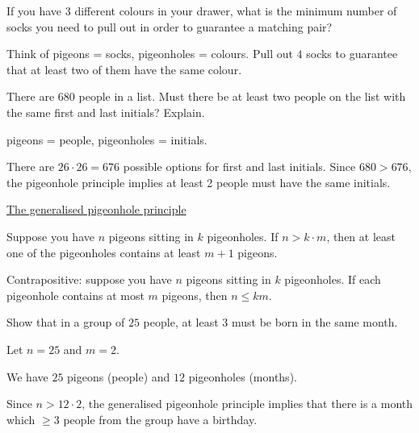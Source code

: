 \begin{example}
    If you have $3$ different colours in your drawer, what is the minimum number of socks you need to pull out in order to guarantee a matching pair?

    Think of pigeons = socks, pigeonholes = colours. Pull out $4$ socks to guarantee that at least two of them have the same colour.
\end{example}

\begin{example}
    There are $680$ people in a list. Must there be at least two people on the list with the same first and last initials? Explain.

    pigeons = people, pigeonholes = initials.

    There are $26\cdot 26 = 676$ possible options for first and last initials. Since $680 > 676$, the pigeonhole principle implies at least 2 people must have the same initials.
\end{example}
\newpage
\begin{definition}
    \underline{The generalised pigeonhole principle}

    Suppose you have $n$ pigeons sitting in $k$ pigeonholes. If $n>k\cdot m$, then at least one of the pigeonholes contains at least $m+1$ pigeons.

    Contrapositive: suppose you have $n$ pigeons sitting in $k$ pigeonholes. If each pigeonhole contains at most $m$ pigeons, then $n\leq km$.
\end{definition}

\begin{example}
    Show that in a group of $25$ people, at least $3$ must be born in the same month.

    Let $n=25$ and $m=2$.

    We have $25$ pigeons (people) and $12$ pigeonholes (months).

    Since $n > 12\cdot 2$, the generalised pigeonhole principle implies that there is a month which $\geq 3$ people from the group have a birthday.
\end{example}
